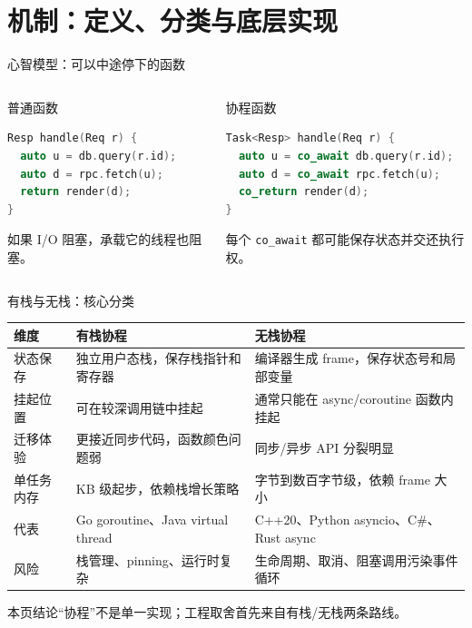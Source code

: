 \documentclass[UTF8,aspectratio=169,11pt]{ctexbeamer}
\newcommand{\takeaway}[1]{\begin{block}{本页结论}#1\end{block}}
\begin{document}
\section{机制：定义、分类与底层实现}

\begin{frame}[fragile]{心智模型：可以中途停下的函数}
  \begin{columns}[T,totalwidth=\linewidth]
    \begin{column}{0.48\linewidth}
      \begin{exampleblock}{普通函数}
\begin{lstlisting}[language=C++]
Resp handle(Req r) {
  auto u = db.query(r.id);
  auto d = rpc.fetch(u);
  return render(d);
}
\end{lstlisting}
      \end{exampleblock}
      {\small 如果 I/O 阻塞，承载它的线程也阻塞。}
    \end{column}
    \begin{column}{0.48\linewidth}
      \begin{block}{协程函数}
\begin{lstlisting}[language=C++]
Task<Resp> handle(Req r) {
  auto u = co_await db.query(r.id);
  auto d = co_await rpc.fetch(u);
  co_return render(d);
}
\end{lstlisting}
      \end{block}
      {\small 每个 \texttt{co\_await} 都可能保存状态并交还执行权。}
    \end{column}
  \end{columns}
\end{frame}

\begin{frame}{有栈与无栈：核心分类}
  \scriptsize
  \begin{tabularx}{\linewidth}{l Y Y}
    \toprule
    维度 & 有栈协程 & 无栈协程 \\
    \midrule
    状态保存 & 独立用户态栈，保存栈指针和寄存器 & 编译器生成 frame，保存状态号和局部变量 \\
    挂起位置 & 可在较深调用链中挂起 & 通常只能在 async/coroutine 函数内挂起 \\
    迁移体验 & 更接近同步代码，函数颜色问题弱 & 同步/异步 API 分裂明显 \\
    单任务内存 & KB 级起步，依赖栈增长策略 & 字节到数百字节级，依赖 frame 大小 \\
    代表 & Go goroutine、Java virtual thread & C++20、Python asyncio、C\#、Rust async \\
    风险 & 栈管理、pinning、运行时复杂 & 生命周期、取消、阻塞调用污染事件循环 \\
    \bottomrule
  \end{tabularx}
  \takeaway{“协程”不是单一实现；工程取舍首先来自有栈/无栈两条路线。}
\end{frame}
\end{document}
